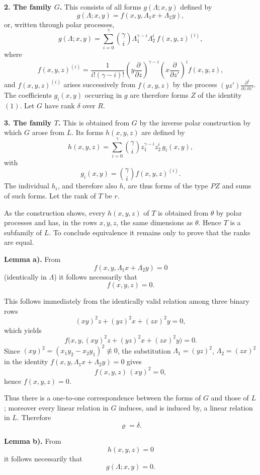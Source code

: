 \documentclass[11pt]{article}
\begin{document}
\medskip
\noindent\textbf{2. The family \(G\).}
This consists of all forms \(g(\Lambda;x,y)\) defined by
\[
g(\Lambda;x,y)=f(x,y,\Lambda_1x+\Lambda_2y),
\]
or, written through polar processes,
\[
g(\Lambda;x,y)=\sum_{i=0}^{\gamma}\binom{\gamma}{i}\Lambda_1^{\gamma-i}\Lambda_2^i\, f(x,y,z)^{(i)},
\]
where
\[
f(x,y,z)^{(i)}=
\frac{1}{i!(\gamma-i)!}
\left(y\frac{\partial}{\partial z}\right)^{\gamma-i}
\left(x\frac{\partial}{\partial z'}\right)^i
f(x,y,z),
\]
and \(f(x,y,z)^{(i)}\) arises successively from \(f(x,y,z)\) by the process \((yz')\frac{\partial^2}{\partial z\,\partial z'}\).
The coefficients \(g_i(x,y)\) occurring in \(g\) are therefore forms \(Z\) of the identity \((1)\). Let \(G\) have rank \(\delta\) over \(R\).

\medskip
\noindent\textbf{3. The family \(T\).}
This is obtained from \(G\) by the inverse polar construction by which \(G\) arose from \(L\). Its forms \(h(x,y,z)\) are defined by
\[
h(x,y,z)=\sum_{i=0}^{\gamma}\binom{\gamma}{i}z_1^{\gamma-i}z_2^i\, g_i(x,y),
\]
with
\[
g_i(x,y)=\binom{\gamma}{i}f(x,y,z)^{(i)}.
\]
The individual \(h_i\), and therefore also \(h\), are thus forms of the type \(PZ\) and sums of such forms. Let the rank of \(T\) be \(r\).

As the construction shows, every \(h(x,y,z)\) of \(T\) is obtained from \(\theta\) by polar processes and has, in the rows \(x,y,z\), the same dimensions as \(\theta\). Hence \(T\) is a subfamily of \(L\). To conclude equivalence it remains only to prove that the ranks are equal.

\medskip
\noindent\textbf{Lemma a).}
From
\[
f(x,y,\Lambda_1x+\Lambda_2y)=0
\]
(identically in \(\Lambda\)) it follows necessarily that
\[
f(x,y,z)=0.
\]

This follows immediately from the identically valid relation among three binary rows
\[
(xy)^2 z+(yz)^2 x+(zx)^2 y=0,
\]
which yields
\[
f\bigl(x,y,(xy)^2z+(yz)^2x+(zx)^2y\bigr)=0.
\]
Since \((xy)^2=(x_1y_2-x_2y_1)^2\not\equiv 0\), the substitution \(\Lambda_1=(yz)^2\), \(\Lambda_2=(zx)^2\) in the identity \(f(x,y,\Lambda_1x+\Lambda_2y)=0\) gives
\[
f(x,y,z)\,(xy)^2=0,
\]
hence \(f(x,y,z)=0\).

Thus there is a one-to-one correspondence between the forms of \(G\) and those of \(L\); moreover every linear relation in \(G\) induces, and is induced by, a linear relation in \(L\). Therefore
\[
\varrho=\delta.
\]

\medskip
\noindent\textbf{Lemma b).}
From
\[
h(x,y,z)=0
\]
it follows necessarily that
\[
g(\Lambda;x,y)=0.
\]
\end{document}
